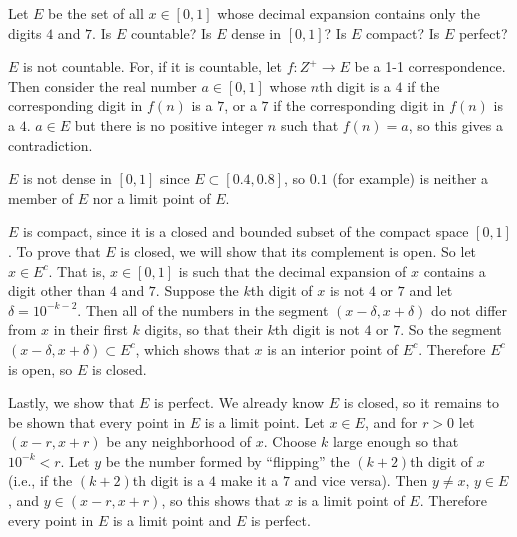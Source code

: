  Let $E$ be the set of all $x\in[0,1]$ whose decimal
expansion contains only the digits $4$ and $7$. Is $E$ countable? Is
$E$ dense in $[0,1]$? Is $E$ compact? Is $E$ perfect?
\begin{solution}
  $E$ is not countable. For, if it is countable, let
  $f\colon Z^+\to E$ be a 1-1 correspondence. Then consider the real
  number $a\in[0,1]$ whose $n$th digit is a $4$ if the corresponding
  digit in $f(n)$ is a $7$, or a $7$ if the corresponding digit in
  $f(n)$ is a $4$. $a\in E$ but there is no positive integer $n$ such
  that $f(n)=a$, so this gives a contradiction.

  $E$ is not dense in $[0,1]$ since $E\subset[0.4,0.8]$, so $0.1$ (for
  example) is neither a member of $E$ nor a limit point of $E$.

  $E$ is compact, since it is a closed and bounded subset of the
  compact space $[0,1]$. To prove that $E$ is closed, we will show
  that its complement is open. So let $x\in E^c$. That is, $x\in[0,1]$
  is such that the decimal expansion of $x$ contains a digit other
  than $4$ and $7$. Suppose the $k$th digit of $x$ is not $4$ or $7$
  and let $\delta = 10^{-k-2}$. Then all of the numbers in the segment
  $(x - \delta, x + \delta)$ do not differ from $x$ in their first $k$
  digits, so that their $k$th digit is not $4$ or $7$. So the segment
  $(x - \delta, x + \delta)\subset E^c$, which shows that $x$ is an
  interior point of $E^c$. Therefore $E^c$ is open, so $E$ is closed.

  Lastly, we show that $E$ is perfect. We already know $E$ is closed,
  so it remains to be shown that every point in $E$ is a limit
  point. Let $x\in E$, and for $r > 0$ let $(x - r, x + r)$ be any
  neighborhood of $x$. Choose $k$ large enough so that $10^{-k} <
  r$. Let $y$ be the number formed by ``flipping'' the $(k+2)$th digit
  of $x$ (i.e., if the $(k+2)$th digit is a $4$ make it a $7$ and vice
  versa). Then $y\neq x$, $y\in E$, and $y\in(x-r,x+r)$, so this shows
  that $x$ is a limit point of $E$. Therefore every point in $E$ is a
  limit point and $E$ is perfect.
\end{solution}


